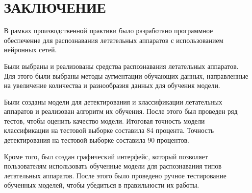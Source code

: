 \chapter*{ЗАКЛЮЧЕНИЕ}

В рамках производственной практики было разработано программное обеспечение для распознавания летательных аппаратов с использованием нейронных сетей.

Были выбраны и реализованы средства распознавания летательных аппаратов. Для этого были выбраны методы аугментации обучающих данных, направленные на увеличение количества и разнообразия данных для обучения модели. 

Были созданы модели для детектирования и классификации летательных аппаратов и реализован алгоритм их обучения. После этого был проведен ряд тестов, чтобы оценить качество модели. Итоговая точность модели классификации на тестовой выборке составила 84 процента. Точность детектирования на тестовой выборке составила 90 процентов.

Кроме того, был создан графический интерфейс, который позволяет пользователям использовать обученные модели для распознавания типов летательных аппаратов. После этого было проведено ручное тестирование обученных моделей, чтобы убедиться в правильности их работы.